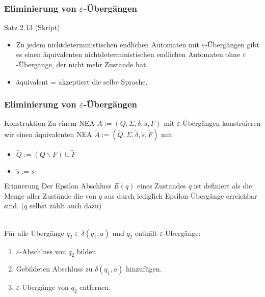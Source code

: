\documentclass{beamer}
\begin{document}
\begin{frame}
	\frametitle{Eliminierung von $\varepsilon$-Übergängen}
	\begin{block}{Satz 2.13 (Skript)}
	\begin{itemize}
	 \item Zu jedem nichtdeterministischen endlichen Automaten mit \(\varepsilon\)-Übergängen gibt es einen äquivalenten nichtdeterministischen
	 endlichen Automaten ohne \(\varepsilon\)-Übergänge, der nicht mehr Zustände hat.
	 \item äquivalent = akzeptiert die selbe Sprache.
	\end{itemize}
	\end{block}
\end{frame}
\begin{frame}
\frametitle{Eliminierung von $\varepsilon$-Übergängen}
	\begin{block}{Konstruktion}
	Zu einem NEA \(A := (Q, \Sigma, \delta, s, F)\) mit \(\varepsilon\)-Übergängen konstruieren wir einen 
	  äquivalenten NEA \(\tilde{A} := (\tilde{Q}, \Sigma, \tilde{\delta}, \tilde{s}, \tilde{F})\) mit
	 \begin{itemize}
	 \item \(\tilde{Q} :=(Q \backslash F)\cup\tilde{F}\)
	 \item \(\tilde{s} := s\)
	 \end{itemize}
	\end{block}

	\begin{block}{Erinnerung}
		Der Epsilon Abschluss $E(q)$ eines Zustandes $q$ ist definiert als die Menge aller Zustände die von $q$ aus durch lediglich Epsilon-Übergänge erreichbar sind. ($q$ selbst zählt auch dazu)
	\end{block}
	\\[0.2cm]
	Für alle Übergänge \(q_2 \in \delta(q_1, a)\) und \(q_2\) enthält \(\varepsilon\)-Übergänge:
	\begin{enumerate}
	 \item \(\varepsilon\)-Abschluss von \(q_2\) bilden
	 \item Gebildeten Abschluss zu \(\delta(q_1, a)\) hinzufügen.
	 \item \(\varepsilon\)-Übergänge von \(q_2\) entfernen.
	\end{enumerate}	
\end{frame}
\end{document}
